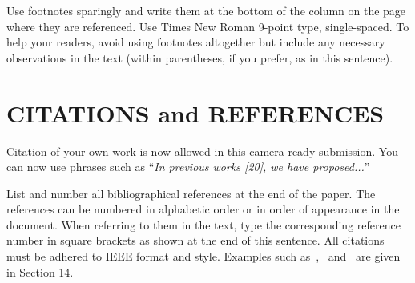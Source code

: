\documentclass{article}
\begin{document}
Use footnotes sparingly and write them at the bottom of the column
on the page where they are referenced. Use Times New Roman 9-point
type, single-spaced. To help your readers, avoid using footnotes
altogether but include any necessary observations in the text
(within parentheses, if you prefer, as in this sentence).



\section{CITATIONS and REFERENCES}
\label{sec:review}

Citation of your own work is now allowed in this camera-ready
submission. You can now use phrases such as ``\emph{In previous
works [20], we have proposed...}''

List and number all bibliographical references at the end of the
paper. The references can be numbered in alphabetic order or in
order of appearance in the document. When referring to them in the
text, type the corresponding reference number in square brackets as
shown at the end of this sentence. All citations must be adhered to
IEEE format and style. Examples such
as~\cite{Morgan2005},~\cite{cooley65} and~\cite{haykin02} are given
in Section 14.



\end{document}
